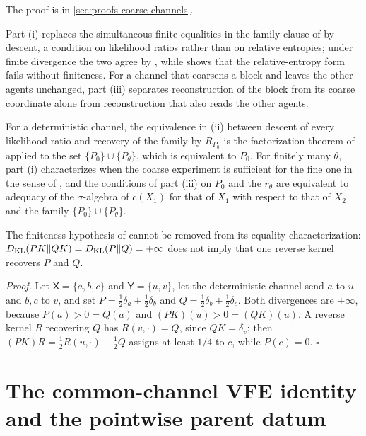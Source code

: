 The proof is in \cref{sec:proofs-coarse-channels}.

Part (i) replaces the simultaneous finite equalities in the family clause of
 by descent, a condition on likelihood ratios rather than on
relative entropies; under finite divergence the two agree by , while
 shows that the relative-entropy form fails without
finiteness. For a channel that coarsens a block and leaves the other agents unchanged, part (iii)
separates reconstruction of the block from its coarse coordinate alone from reconstruction that also
reads the other agents.

For a deterministic channel, the equivalence in (ii) between descent of every likelihood ratio and
recovery of the family by $R_{P_0}$ is the factorization theorem of
\citet[Sec.~5, Theorem~1]{HalmosSavage1949} applied to the set $\{P_0\}\cup\{P_\theta\}$, which is
equivalent to $P_0$. For finitely many $\theta$, part (i) characterizes when the coarse experiment is
sufficient for the fine one in the sense of \citet[Sec.~2]{Blackwell1953}, and the conditions of part
(iii) on $P_0$ and the $r_\theta$ are equivalent to adequacy \citep[Sec.~2, Definition~1]{Skibinsky1967}
of the $\sigma$-algebra of $c(X_1)$ for that of $X_1$ with respect to that of $X_2$ and the family
$\{P_0\}\cup\{P_\theta\}$.

The finiteness hypothesis of  cannot be removed from its equality
characterization: $D_{\mathrm{KL}}(PK\Vert QK)=D_{\mathrm{KL}}(P\Vert Q)=+\infty$ does not imply that one reverse kernel
recovers $P$ and $Q$. 

\noindent\emph{Proof.}
Let $\mathsf X=\{a,b,c\}$ and $\mathsf Y=\{u,v\}$, let the deterministic channel send $a$ to $u$
and $b,c$ to $v$, and set $P=\tfrac12\delta_a+\tfrac12\delta_b$ and
$Q=\tfrac12\delta_b+\tfrac12\delta_c$. Both divergences are $+\infty$, because $P(a)>0=Q(a)$ and
$(PK)(u)>0=(QK)(u)$. A reverse kernel $R$ recovering $Q$ has $R(v,\cdot)=Q$, since $QK=\delta_v$;
then $(PK)R=\tfrac12R(u,\cdot)+\tfrac12Q$ assigns at least $1/4$ to $c$, while $P(c)=0$. $\square$

\section{The common-channel VFE identity and the pointwise parent datum}
\label{sec:cg-elbo}
\label{sec:rg-law-level-vfe}
\label{eq:rg-coarse-channel}

